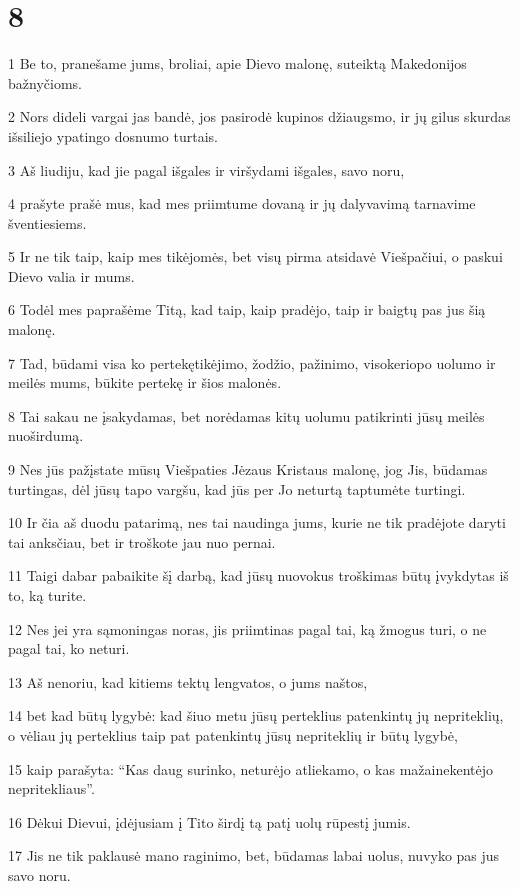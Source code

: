 \chapter{8}


\par 1 Be to, pranešame jums, broliai, apie Dievo malonę, suteiktą Makedonijos bažnyčioms. 
\par 2 Nors dideli vargai jas bandė, jos pasirodė kupinos džiaugsmo, ir jų gilus skurdas išsiliejo ypatingo dosnumo turtais. 
\par 3 Aš liudiju, kad jie pagal išgales ir viršydami išgales, savo noru, 
\par 4 prašyte prašė mus, kad mes priimtume dovaną ir jų dalyvavimą tarnavime šventiesiems. 
\par 5 Ir ne tik taip, kaip mes tikėjomės, bet visų pirma atsidavė Viešpačiui, o paskui Dievo valia ir mums. 
\par 6 Todėl mes paprašėme Titą, kad taip, kaip pradėjo, taip ir baigtų pas jus šią malonę. 
\par 7 Tad, būdami visa ko pertekę­tikėjimo, žodžio, pažinimo, visokeriopo uolumo ir meilės mums,­ būkite pertekę ir šios malonės. 
\par 8 Tai sakau ne įsakydamas, bet norėdamas kitų uolumu patikrinti jūsų meilės nuoširdumą. 
\par 9 Nes jūs pažįstate mūsų Viešpaties Jėzaus Kristaus malonę, jog Jis, būdamas turtingas, dėl jūsų tapo vargšu, kad jūs per Jo neturtą taptumėte turtingi. 
\par 10 Ir čia aš duodu patarimą, nes tai naudinga jums, kurie ne tik pradėjote daryti tai anksčiau, bet ir troškote jau nuo pernai. 
\par 11 Taigi dabar pabaikite šį darbą, kad jūsų nuovokus troškimas būtų įvykdytas iš to, ką turite. 
\par 12 Nes jei yra sąmoningas noras, jis priimtinas pagal tai, ką žmogus turi, o ne pagal tai, ko neturi. 
\par 13 Aš nenoriu, kad kitiems tektų lengvatos, o jums naštos, 
\par 14 bet kad būtų lygybė: kad šiuo metu jūsų perteklius patenkintų jų nepriteklių, o vėliau jų perteklius taip pat patenkintų jūsų nepriteklių ir būtų lygybė, 
\par 15 kaip parašyta: “Kas daug surinko, neturėjo atliekamo, o kas mažai­nekentėjo nepritekliaus”. 
\par 16 Dėkui Dievui, įdėjusiam į Tito širdį tą patį uolų rūpestį jumis. 
\par 17 Jis ne tik paklausė mano raginimo, bet, būdamas labai uolus, nuvyko pas jus savo noru. 
